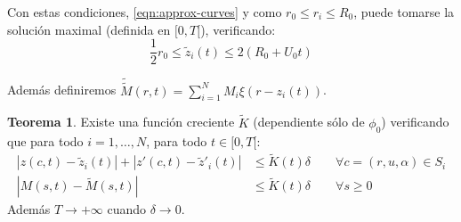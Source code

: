 \documentclass[a4paper,10pt]{scrartcl}
\theoremstyle{definition}
\newtheorem{theorem}{Teorema}
\newcommand{\ktilde}{\widetilde{K}}
\newcommand{\dtilde}[1]{\widetilde{\widetilde{#1}}}
\numberwithin{equation}{section}
\begin{document}
Con estas condiciones, \eqref{eqn:approx-curves} y como $r_0 \le r_i \le R_0$, puede tomarse la solución maximal (definida en $[0,T[$), verificando:
\begin{equation}
    \frac{1}{2}r_0 \le \widetilde{z}_i(t) \le 2(R_0 + U_0t)
\label{eqn:barzbounds}
\end{equation}

Además definiremos $\dtilde{M}(r,t) = \sum_{i=1}^N M_i \xi(r-z_i(t))$.
\begin{theorem}
 Existe una función creciente $\widetilde{K}$ (dependiente sólo de $\phi_0$) verificando que para todo $i = 1, \ldots, N$, para todo $t\in [0,T[$:
 \begin{align*}
  |z(c,t) - \widetilde{z}_i(t)| + |z'(c,t) - \widetilde{z}'_i(t)| &\le \ktilde(t) \delta \qquad \forall c= (r,u,\alpha) \in S_i \\
  |M(s,t) - \widetilde{M}(s,t)| &\le \ktilde(t)\delta \qquad \forall s \ge 0
 \end{align*}
 Además $T \rightarrow + \infty$ cuando $\delta \rightarrow 0$.
 \label{th:fundamental}
\end{theorem}
\end{document}
